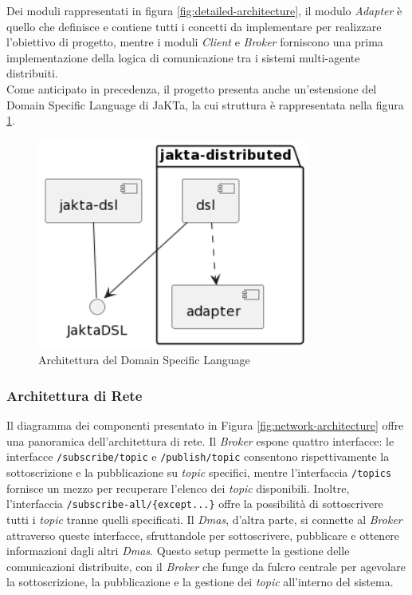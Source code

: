 Dei moduli rappresentati in figura \ref{fig:detailed-architecture}, il modulo \textit{Adapter} è quello che definisce e contiene tutti i concetti da implementare per realizzare l'obiettivo di progetto,
mentre i moduli \textit{Client} e \textit{Broker} forniscono una prima implementazione della logica di comunicazione tra i sistemi multi-agente distribuiti.\\

Come anticipato in precedenza, il progetto presenta anche un'estensione del Domain Specific Language di JaKTa, la cui struttura è rappresentata nella figura \ref{fig:dsl-architecture}.

\begin{figure}[ht!]
    \centering
    \includegraphics[width=0.8\textwidth]{figures/dsl-architecture.png}
    \caption{Architettura del Domain Specific Language}
    \label{fig:dsl-architecture}
\end{figure}

\subsubsection{Architettura di Rete}

Il diagramma dei componenti presentato in Figura \ref{fig:network-architecture} offre una panoramica dell'architettura di rete.
Il \textit{Broker} espone quattro interfacce: le interfacce \texttt{/subscribe/{topic}} e \texttt{/publish/{topic}} consentono rispettivamente la sottoscrizione e la pubblicazione su \textit{topic} specifici, mentre l'interfaccia \texttt{/topics} fornisce un mezzo per recuperare l'elenco dei \textit{topic} disponibili. Inoltre, l'interfaccia \texttt{/subscribe-all/\{except...\}} offre la possibilità di sottoscrivere tutti i \textit{topic} tranne quelli specificati. Il \textit{Dmas}, d'altra parte, si connette al \textit{Broker} attraverso queste interfacce, sfruttandole per sottoscrivere, pubblicare e ottenere informazioni dagli altri \textit{Dmas}. Questo setup permette la gestione delle comunicazioni distribuite, con il \textit{Broker} che funge da fulcro centrale per agevolare la sottoscrizione, la pubblicazione e la gestione dei \textit{topic} all'interno del sistema.

